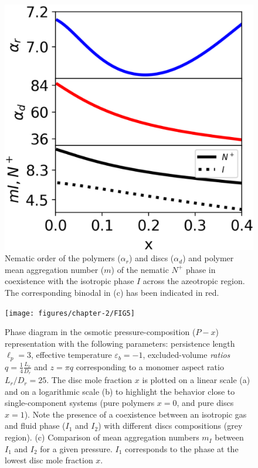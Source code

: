 \begin{figure}
  \includegraphics[width= .6\linewidth]{figures/chapter-2/FIG4}
\caption{Nematic order of the polymers ($\alpha_{r}$) and discs ($\alpha_{d}$) and polymer mean aggregation number ($m$) of  the nematic $N^{+}$ phase in coexistence with the isotropic phase $I$  across the azeotropic region. The corresponding binodal in (c) has been indicated in red. } 
  \label{fig:azeotrope}
\end{figure}

\begin{figure}[ht]
  \texttt{[image: figures/chapter-2/FIG5]}
\caption{Phase diagram in the osmotic pressure-composition ($P-x$) representation with the following parameters: persistence length $\ell_{p} = 3$, effective temperature $\varepsilon_{b} = -1$, excluded-volume {\em ratios} $q = \frac{1}{4}\frac{L_{r}}{D_{r}}$ and $z=\pi q$ corresponding to a monomer aspect ratio $L_{r}/D_{r} =25$. The disc mole fraction $x$ is plotted on a linear scale (a) and on a logarithmic scale (b) to highlight the behavior close to single-component systems (pure polymers $x=0$, and pure discs $x=1$). Note the presence of a coexistence between an isotropic gas and fluid  phase ($I_1$ and $I_2$) with different discs compositions (grey region). (c) Comparison of mean aggregation numbers $m_{I}$ between $I_{1}$ and $I_{2}$ for a given pressure. $I_{1}$ corresponds to the phase at the lowest disc mole fraction $x$. }
  \label{fig:coexistence}
\end{figure}

